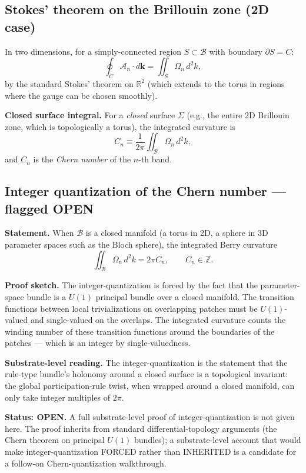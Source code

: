 \documentclass[11pt,a4paper]{article}
\begin{document}
\subsection{Stokes' theorem on the Brillouin zone (2D case)}

In two dimensions, for a simply-connected region $S \subset \mathcal{B}$ with boundary $\partial S = C$:
\[
\oint_C \mathcal{A}_n \cdot d\mathbf{k} = \iint_S \Omega_n\, d^{2}k,
\]
by the standard Stokes' theorem on $\mathbb{R}^2$ (which extends to the torus in regions where the gauge can be chosen smoothly).

\textbf{Closed surface integral.} For a \emph{closed} surface $\Sigma$ (e.g., the entire 2D Brillouin zone, which is topologically a torus), the integrated curvature is
\[
C_n \equiv \frac{1}{2\pi} \iint_\mathcal{B} \Omega_n\, d^{2}k,
\]
and $C_n$ is the \emph{Chern number} of the $n$-th band.

\subsection{Integer quantization of the Chern number --- flagged OPEN}

\textbf{Statement.} When $\mathcal{B}$ is a closed manifold (a torus in 2D, a sphere in 3D parameter spaces such as the Bloch sphere), the integrated Berry curvature
\[
\iint_\mathcal{B} \Omega_n\, d^{2}k = 2\pi C_n, \qquad C_n \in \mathbb{Z}.
\]

\textbf{Proof sketch.} The integer-quantization is forced by the fact that the parameter-space bundle is a $U(1)$ principal bundle over a closed manifold. The transition functions between local trivializations on overlapping patches must be $U(1)$-valued and single-valued on the overlaps. The integrated curvature counts the winding number of these transition functions around the boundaries of the patches --- which is an integer by single-valuedness.

\textbf{Substrate-level reading.} The integer-quantization is the statement that the rule-type bundle's holonomy around a closed surface is a topological invariant: the global participation-rule twist, when wrapped around a closed manifold, can only take integer multiples of $2\pi$.

\textbf{Status: OPEN.} A full substrate-level proof of integer-quantization is not given here. The proof inherits from standard differential-topology arguments (the Chern theorem on principal $U(1)$ bundles); a substrate-level account that would make integer-quantization FORCED rather than INHERITED is a candidate for a follow-on Chern-quantization walkthrough.
\end{document}
